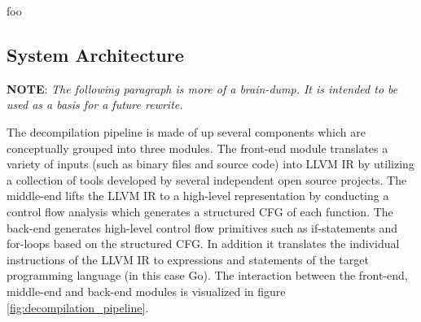 %



foo




\subsection{System Architecture}




\textbf{NOTE}: \textit{The following paragraph is more of a brain-dump. It is intended to be used as a basis for a future rewrite.}

The decompilation pipeline is made of up several components which are conceptually grouped into three modules. The front-end module translates a variety of inputs (such as binary files and source code) into LLVM IR by utilizing a collection of tools developed by several independent open source projects. The middle-end lifts the LLVM IR to a high-level representation by conducting a control flow analysis which generates a structured CFG of each function. The back-end generates high-level control flow primitives such as if-statements and for-loops based on the structured CFG. In addition it translates the individual instructions of the LLVM IR to expressions and statements of the target programming language (in this case Go). The interaction between the front-end, middle-end and back-end modules is visualized in figure \ref{fig:decompilation_pipeline}.

